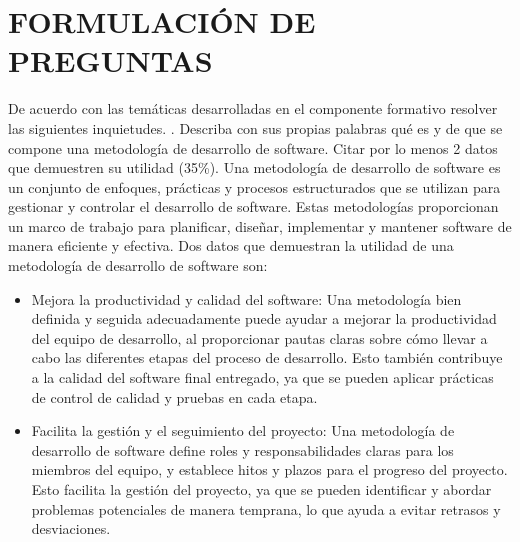 \documentclass{article}
\theoremstyle{mytheoremstyle}
\theoremstyle{mytheoremstyle}
\theoremstyle{myproblemstyle}
\begin{document}
    
\section{FORMULACIÓN DE PREGUNTAS}
De acuerdo con las temáticas desarrolladas en el componente formativo resolver las siguientes inquietudes.
. Describa con sus propias palabras qué es y de que se compone una metodología de desarrollo de software. Citar por lo menos 2 datos que demuestren su utilidad (35\%).
\newline 
Una metodología de desarrollo de software es un conjunto de enfoques, prácticas y procesos estructurados que se utilizan para gestionar y controlar el desarrollo de software. Estas metodologías proporcionan un marco de trabajo para planificar, diseñar, implementar y mantener software de manera eficiente y efectiva.
\newline
Dos datos que demuestran la utilidad de una metodología de desarrollo de software son:
\begin{itemize}
    \item Mejora la productividad y calidad del software: Una metodología bien definida y seguida adecuadamente puede ayudar a mejorar la productividad del equipo de desarrollo, al proporcionar pautas claras sobre cómo llevar a cabo las diferentes etapas del proceso de desarrollo. Esto también contribuye a la calidad del software final entregado, ya que se pueden aplicar prácticas de control de calidad y pruebas en cada etapa.
    \item Facilita la gestión y el seguimiento del proyecto: Una metodología de desarrollo de software define roles y responsabilidades claras para los miembros del equipo, y establece hitos y plazos para el progreso del proyecto. Esto facilita la gestión del proyecto, ya que se pueden identificar y abordar problemas potenciales de manera temprana, lo que ayuda a evitar retrasos y desviaciones.
\end{itemize}
\end{document}
